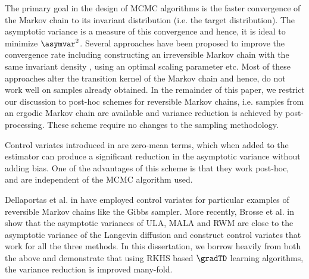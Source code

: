 The primary goal in the design of MCMC algorithms is the faster convergence of the Markov chain to its invariant distribution (i.e. the target distribution). The asymptotic variance is a measure of this convergence and hence, it is ideal to minimize $\asymvar^2$. Several approaches have been proposed to improve the convergence rate including constructing an irreversible Markov chain with the same invariant density \cite{hwanorwu15, dunlelpav16}, using an optimal scaling parameter \cite{robros01} etc. Most of these approaches alter the transition kernel of the Markov chain and hence, do not work well on samples already obtained. In the remainder of this paper, we restrict our discussion to post-hoc schemes for reversible Markov chains, i.e. samples from an ergodic Markov chain are available and variance reduction is achieved by post-processing. These scheme require no changes to the sampling methodology. 

Control variates introduced in \cite{HenThesis,henmeytad03a,kimhen07,ctcn} are zero-mean terms, which when added to the estimator can produce a significant reduction in the asymptotic variance without adding bias. One of the advantages of this scheme is that they work post-hoc, and are independent of the MCMC algorithm used. 

Dellaportas et al. in \cite{delkon12} have employed control variates for particular examples of reversible Markov chains like the Gibbs sampler.
More recently, Brosse et al. in \cite{brodurmeymou18} show that the asymptotic variances of ULA, MALA and RWM are close to the asymptotic variance of the Langevin diffusion and construct control variates that work for all the three methods. In this dissertation, we borrow heavily from both the above and demonstrate that using RKHS based $\gradTD$ learning algorithms, the variance reduction is improved many-fold. 

